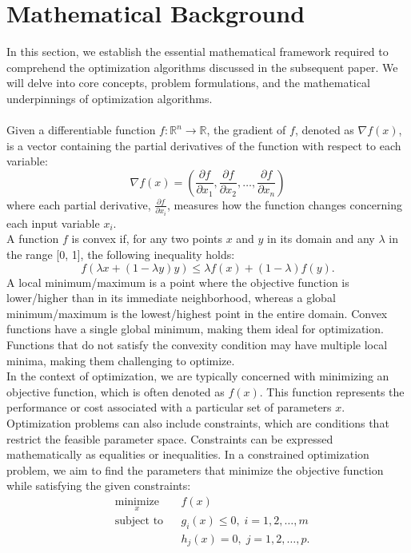 \documentclass{article}
\begin{document}
\section*{Mathematical Background}
In this section, we establish the essential mathematical framework required to comprehend the optimization algorithms discussed in the subsequent paper. We will delve into core concepts, problem formulations, and the mathematical underpinnings of optimization algorithms.\\
\\
Given a differentiable function $f:\mathbb{R}^n\to\mathbb{R}$, the gradient of $f$, denoted as $\nabla f(x)$, is a vector containing the partial derivatives of the function with respect to each variable:
\[\nabla f(x)=\left(\frac{\partial f}{\partial x_1},\frac{\partial f}{\partial x_2},\dots ,\frac{\partial f}{\partial x_n}\right)\]
where each partial derivative, $\frac{\partial f}{\partial x_i}$, measures how the function changes concerning each input variable $x_i$.
\\
A function $f$ is convex if, for any two points $x$ and $y$ in its domain and any $\lambda$ in the range [0, 1], the following inequality holds:
\[f\left(\lambda x+(1-\lambda y)y\right)\leq\lambda f(x)+(1-\lambda)f(y).\]
A local minimum/maximum is a point where the objective function is lower/higher than in its immediate neighborhood, whereas a global minimum/maximum is the lowest/highest point in the entire domain. Convex functions have a single global minimum, making them ideal for optimization. Functions that do not satisfy the convexity condition may have multiple local minima, making them challenging to optimize.\\
In the context of optimization, we are typically concerned with minimizing an objective function, which is often denoted as $f(x)$. This function represents the performance or cost associated with a particular set of parameters $x$. Optimization problems can also include constraints, which are conditions that restrict the feasible parameter space. Constraints can be expressed mathematically as equalities or inequalities. In a constrained optimization problem, we aim to find the parameters that minimize the objective function while satisfying the given constraints:
\begin{equation*}
\begin{aligned}
& \underset{x}{\text{minimize}} & & f(x)
 \\
& \text{subject to}
& & g_i(x) \leq 0, \; i = 1,2, \ldots, m\\
&&& h_j(x)=0, \; j=1,2,\ldots, p.
\end{aligned}
\end{equation*}
\end{document}
